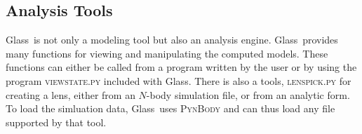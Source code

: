 \documentclass[galley,usenatbib]{mn2e}
\newcommand{\Glass}{{\sc Glass}}
\newcommand{\PixeLens}{{\sc PixeLens}}
\begin{document}

\subsection{Analysis Tools}\label{sec:tools}
\Glass\ is not only a modeling tool but also an analysis engine. \Glass\
provides many functions for viewing and manipulating the computed models.
These functions can either be called from a program written by the user or 
by using the program \textsc{viewstate.py} included with \Glass. There is
also a tools, \textsc{lenspick.py} for creating a lens, either from an $N$-body
simulation file, or from an analytic form. To load the simluation data, \Glass\
uses \textsc{PynBody} and can thus load any file supported by that tool.
\end{document}
